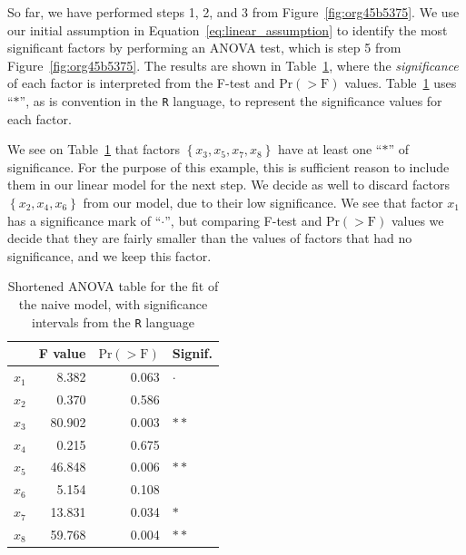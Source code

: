 \documentclass[conference]{IEEEtran}
\begin{document}
So    far,    we     have    performed    steps    1,    2,     and    3    from
Figure~\ref{fig:org45b5375}.    We    use    our   initial    assumption    in
Equation~\eqref{eq:linear_assumption} to identify the most significant factors by
performing     an      ANOVA     test,     which     is      step     5     from
Figure~\ref{fig:org45b5375}.      The      results      are      shown      in
Table~\ref{tab:anova_linear},   where  the   \emph{significance}  of   each  factor   is
interpreted    from    the    F-test    and    \(\text{Pr}(>\text{F})\)    values.
Table~\ref{tab:anova_linear}  uses ``\(*\)'',  as is  convention in  the \texttt{R}
language, to represent the significance values for each factor.

We see on  Table~\ref{tab:anova_linear} that factors \(\left\{x_3,x_5,x_7,x_8\right\}\)
have at least one ``\(*\)'' of significance. For the purpose of this example, this
is sufficient reason to  include them in our linear model for  the next step. We
decide as well to discard  factors \(\left\{x_2,x_4,x_6\right\}\) from our model, due
to their low  significance. We see that  factor \(x_1\) has a  significance mark of
``\(\cdot\)'', but  comparing F-test  and \(\text{Pr}(>\text{F})\)  values we  decide that
they are fairly smaller than the values of factors that had no significance, and
we keep this factor.

\begin{table}[t]
\centering
\caption{Shortened ANOVA table for the fit of the naive model, with significance intervals from the \texttt{R} language}
\label{tab:anova_linear}
\begingroup\small
\begin{tabular}{lrrl}
  \toprule
 & F value & $\text{Pr}(>\text{F})$ & Signif. \\
  \midrule
$x_1$ & 8.382 & 0.063 & $\cdot$ \\
  $x_2$ & 0.370 & 0.586 &   \\
  $x_3$ & 80.902 & 0.003 & $**$ \\
  $x_4$ & 0.215 & 0.675 &   \\
  $x_5$ & 46.848 & 0.006 & $**$ \\
  $x_6$ & 5.154 & 0.108 &   \\
  $x_7$ & 13.831 & 0.034 & $*$ \\
  $x_8$ & 59.768 & 0.004 & $**$ \\
   \bottomrule
\end{tabular}
\endgroup
\end{table}
\end{document}
